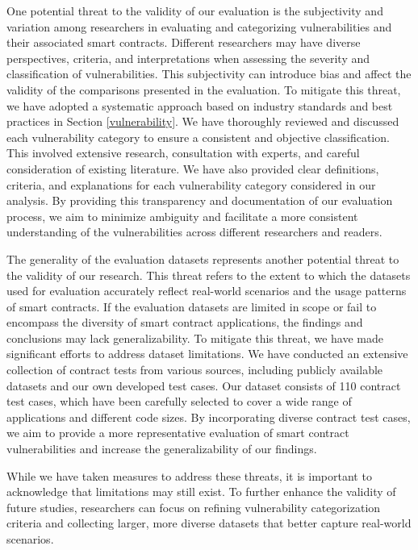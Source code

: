 \documentclass[manuscript,screen]{acmart}
\begin{document}
One potential threat to the validity of our evaluation is the subjectivity and variation among researchers in evaluating and categorizing vulnerabilities and their associated smart contracts. Different researchers may have diverse perspectives, criteria, and interpretations when assessing the severity and classification of vulnerabilities. This subjectivity can introduce bias and affect the validity of the comparisons presented in the evaluation. 
To mitigate this threat, we have adopted a systematic approach based on industry standards and best practices in Section \ref{vulnerability}. We have thoroughly reviewed and discussed each vulnerability category to ensure a consistent and objective classification. This involved extensive research, consultation with experts, and careful consideration of existing literature. We have also provided clear definitions, criteria, and explanations for each vulnerability category considered in our analysis. 
By providing this transparency and documentation of our evaluation process, we aim to minimize ambiguity and facilitate a more consistent understanding of the vulnerabilities across different researchers and readers.

The generality of the evaluation datasets represents another potential threat to the validity of our research. This threat refers to the extent to which the datasets used for evaluation accurately reflect real-world scenarios and the usage patterns of smart contracts. If the evaluation datasets are limited in scope or fail to encompass the diversity of smart contract applications, the findings and conclusions may lack generalizability. 
To mitigate this threat, we have made significant efforts to address dataset limitations. We have conducted an extensive collection of contract tests from various sources, including publicly available datasets and our own developed test cases. Our dataset consists of 110 contract test cases, which have been carefully selected to cover a wide range of applications and different code sizes. 
By incorporating diverse contract test cases, we aim to provide a more representative evaluation of smart contract vulnerabilities and increase the generalizability of our findings.

While we have taken measures to address these threats, it is important to acknowledge that limitations may still exist. To further enhance the validity of future studies, researchers can focus on refining vulnerability categorization criteria and collecting larger, more diverse datasets that better capture real-world scenarios.
\end{document}
